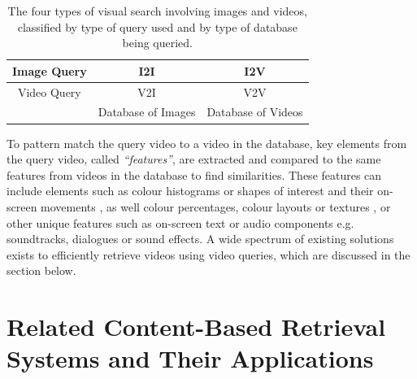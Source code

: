 \begin{table}[H]
\centering
\begin{tabular}{c|c|c|}
\hline
\multicolumn{1}{|c|}{Image Query} & I2I                & I2V                \\ \hline
\multicolumn{1}{|c|}{Video Query} & V2I                & V2V                \\ \hline
\multicolumn{1}{l|}{}             & Database of Images & Database of Videos \\ \cline{2-3} 
\end{tabular}
\caption{The four types of visual search involving images and videos, classified by type of query used and by type of database being queried.}
\label{table:visual_search_table}
\end{table}

To pattern match the query video to a video in the database, key elements from the query video, called \textit{``features''}, are extracted and compared to the same features from videos in the database to find similarities. These features can include elements such as colour histograms or shapes of interest and their on-screen movements \cite{patel2012}, as well colour percentages, colour layouts or textures \cite{petkovic2000}, or other unique features such as on-screen text or audio components e.g. soundtracks, dialogues or sound effects. A wide spectrum of existing solutions exists to efficiently retrieve videos using video queries, which are discussed in the section below.

\section{Related Content-Based Retrieval Systems and Their Applications}
\label{sec:v2v_applications}

